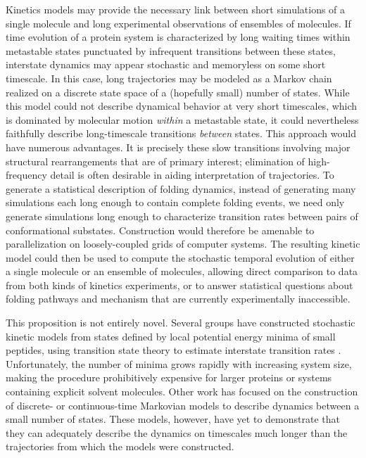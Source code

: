 Kinetics models may provide the necessary link between short simulations of a single molecule and long experimental observations of ensembles of molecules.  
If time evolution of a protein system is characterized by long waiting times within metastable states punctuated by infrequent transitions between these states, interstate dynamics may appear stochastic and memoryless on some short timescale.
In this case, long trajectories may be modeled as a Markov chain realized on a discrete state space of a (hopefully small) number of states.
While this model could not describe dynamical behavior at very short timescales, which is dominated by molecular motion \emph{within} a metastable state, it could nevertheless faithfully describe long-timescale transitions \emph{between} states.
This approach would have numerous advantages. 
It is precisely these slow transitions involving major structural rearrangements that are of primary interest; elimination of high-frequency detail is often desirable in aiding interpretation of trajectories.
To generate a statistical description of folding dynamics, instead of generating many simulations each long enough to contain complete folding events, we need only generate simulations long enough to characterize transition rates between pairs of conformational substates. 
Construction would therefore be amenable to parallelization on loosely-coupled grids of computer systems.  
The resulting kinetic model could then be used to compute the stochastic temporal evolution of either a single molecule or an ensemble of molecules, allowing direct comparison to data from both kinds of kinetics experiments, or to answer statistical questions about folding pathways and mechanism that are currently experimentally inaccessible.

This proposition is not entirely novel.
Several groups have constructed stochastic kinetic models from states defined by local potential energy minima of small peptides, using transition state theory to estimate interstate transition rates \cite{kunz:1995a,ball:1998b,levy:2001a,mortenson:2001a,mortenson:2002a}.
Unfortunately, the number of minima grows rapidly with increasing system size, making the procedure prohibitively expensive for larger proteins or systems containing explicit solvent molecules.
Other work \cite{degroot:2001a,swope:2004b,singhal:2004a,levy:2005a,sriraman:2005a,schultheis:2005a} has focused on the construction of discrete- or continuous-time Markovian models to describe dynamics between a small number of states.
These models, however, have yet to demonstrate that they can adequately describe the dynamics on timescales much longer than the trajectories from which the models were constructed.

